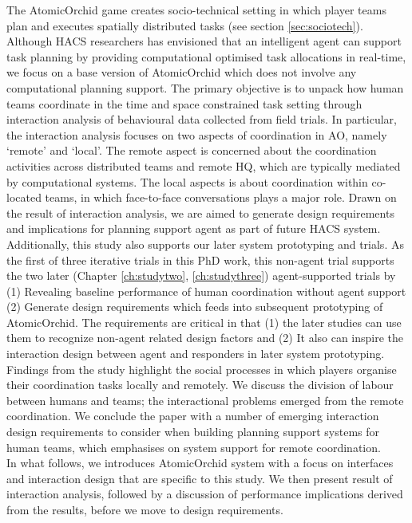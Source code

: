 The AtomicOrchid game creates socio-technical setting in which player teams plan and executes spatially distributed tasks (see section \ref{sec:sociotech}). Although \ac{HACS} researchers has envisioned that an intelligent agent can support task planning by providing computational optimised task allocations in real-time, we focus on a base version of AtomicOrchid which does not involve any computational planning support. The primary objective is to unpack how human teams coordinate in the time and space constrained task setting through interaction analysis of behavioural data collected from field trials. In particular, the interaction analysis focuses on two aspects of coordination in \ac{AO}, namely `remote' and `local'. The remote aspect is concerned about the coordination activities across distributed teams and remote HQ, which are typically mediated by computational systems. The local aspects is about coordination within co-located teams, in which face-to-face conversations plays a major role. Drawn on the result of interaction analysis, we are aimed to generate design requirements and implications for planning support agent as part of future \ac{HACS} system.      \\

Additionally, this study also supports our later system prototyping and trials. As the first of three iterative trials in this PhD work, this non-agent trial supports the two later (Chapter \ref{ch:studytwo}, \ref{ch:studythree}) agent-supported trials by (1) Revealing baseline performance of human coordination without agent support (2) Generate design requirements which feeds into subsequent prototyping of AtomicOrchid. The requirements are critical in that (1) the later studies can use them to recognize non-agent related design factors and (2) It also can inspire the interaction design between agent and responders in later system prototyping.  \\

Findings from the study highlight the social processes in which players organise their coordination tasks locally and remotely. We discuss the division of labour between humans and teams; the interactional problems emerged from the remote coordination. We conclude the paper with a number of emerging interaction design requirements to consider when building planning support systems for human teams, which emphasises on system support for remote coordination. \\

In what follows, we introduces AtomicOrchid system with a focus on interfaces and interaction design that are specific to this study. We then present result of interaction analysis, followed by a discussion of performance implications derived from the results, before we move to design requirements. \\

